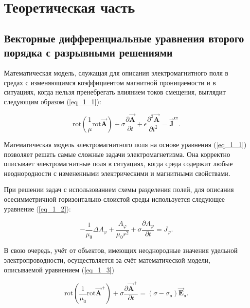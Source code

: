 \chapter{Теоретическая часть}

\section{Векторные дифференциальные уравнения второго порядка с разрывными решениями}

Математическая модель, служащая для описания электромагнитного поля в средах с изменяющимся коэффициентом магнитной проницаемости и в ситуациях, когда нельзя пренебрегать влиянием токов смещения, выглядит следующим образом (\ref{eq_1_1}):

\begin{equation} \label{eq_1_1}
	\text{rot} \left( \frac{1}{\mu} \text{rot} \overrightarrow{\textbf{A}} \right) + \sigma \frac{\partial \overrightarrow{\textbf{A}}}{\partial t} + \epsilon \frac{\partial^2 \overrightarrow{\textbf{A}}}{\partial t^2} = \overrightarrow{\textbf{J}}^{\textbf{ст}}.
\end{equation}

Математическая модель электромагнитного поля на основе уравнения (\ref{eq_1_1}) позволяет решать самые сложные задачи электромагнетизма. Она корректно описывает электромагнитные поля в ситуациях, когда среда содержит любые неоднородности с измененными электрическими и магнитными свойствами.

При решении задач с использованием схемы разделения полей, для описания осесимметричной горизонтально-слоистой среды используется следующее уравнение (\ref{eq_1_2}):

\begin{equation} \label{eq_1_2}
	-\frac{1}{\mu_0} \Delta A_{\varphi} + \frac{A_{\varphi}}{\mu_0 r^2} + \sigma \frac{\partial A_{\varphi}}{\partial t} = J_{\varphi}.
\end{equation}

В свою очередь, учёт от объектов, имеющих неоднородные значения удельной электропроводности, осуществляется за счёт математической модели, описываемой уравнением (\ref{eq_1_3})

\begin{equation} \label{eq_1_3}
	\text{rot} \left( \frac{1}{\mu_0} \text{rot} \overrightarrow{\textbf{A}}^+ \right) + \sigma \frac{\partial \overrightarrow{\textbf{A}}^+}{\partial t} = \left( \sigma - \sigma_{\text{n}} \right) \overrightarrow{\textbf{E}}_{\text{n}}.
\end{equation}


